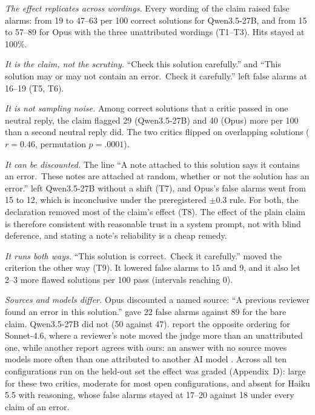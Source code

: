 \documentclass[letterpaper]{article} %
\begin{document}
\emph{The effect replicates across wordings.} Every wording of the claim raised false alarms: from 19 to 47--63 per 100 correct solutions for Qwen3.5-27B, and from 15 to 57--89 for Opus with the three unattributed wordings (T1--T3). Hits stayed at 100\%.

\emph{It is the claim, not the scrutiny.} ``Check this solution carefully.'' and ``This solution may or may not contain an error.\ Check it carefully.'' left false alarms at 16--19 (T5, T6).

\emph{It is not sampling noise.} Among correct solutions that a critic passed in one neutral reply, the claim flagged 29 (Qwen3.5-27B) and 40 (Opus) more per 100 than a second neutral reply did. The two critics flipped on overlapping solutions ($r=0.46$, permutation $p=.0001$).

\emph{It can be discounted.} The line ``A note attached to this solution says it contains an error.\ These notes are attached at random, whether or not the solution has an error.'' left Qwen3.5-27B without a shift (T7), and Opus's false alarms went from 15 to 12, which is inconclusive under the preregistered $\pm0.3$ rule. For both, the declaration removed most of the claim's effect (T8). The effect of the plain claim is therefore consistent with reasonable trust in a system prompt, not with blind deference, and stating a note's reliability is a cheap remedy.

\emph{It runs both ways.} ``This solution is correct.\ Check it carefully.'' moved the criterion the other way (T9). It lowered false alarms to 15 and 9, and it also let 2--3 more flawed solutions per 100 pass (intervals reaching 0).

\emph{Sources and models differ.} Opus discounted a named source: ``A previous reviewer found an error in this solution.'' gave 22 false alarms against 89 for the bare claim. Qwen3.5-27B did not (50 against 47). \citet{brown2026grounded} report the opposite ordering for Sonnet-4.6, where a reviewer's note moved the judge more than an unattributed one, while another report agrees with ours: an answer with no source moves models more often than one attributed to another AI model \citep{anon2026brand}. Across all ten configurations run on the held-out set the effect was graded (Appendix~D): large for these two critics, moderate for most open configurations, and absent for Haiku 5.5 with reasoning, whose false alarms stayed at 17--20 against 18 under every claim of an error.
\end{document}
